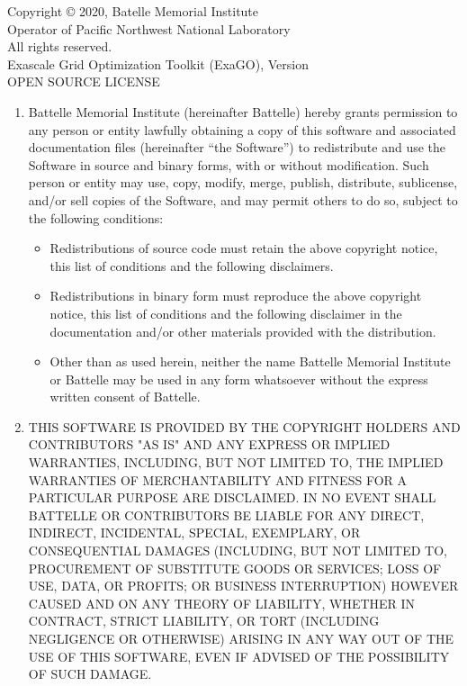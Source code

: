\noindent
Copyright © 2020, Batelle Memorial Institute \\
Operator of Pacific Northwest National Laboratory \\
All rights reserved. \\
Exascale Grid Optimization Toolkit (ExaGO), Version \exagoversion \\
OPEN SOURCE LICENSE \\

\noindent
\begin{enumerate}
\item Battelle Memorial Institute (hereinafter Battelle) hereby grants permission to any person or entity lawfully obtaining a copy of this software and associated documentation files (hereinafter “the Software”) to redistribute and use the Software in source and binary forms, with or without modification.  Such person or entity may use, copy, modify, merge, publish, distribute, sublicense, and/or sell copies of the Software, and may permit others to do so, subject to the following conditions:
\begin{itemize}
    \item Redistributions of source code must retain the above copyright notice, this list of conditions and the following disclaimers. 
   \item Redistributions in binary form must reproduce the above copyright notice, this list of conditions and the following disclaimer in the documentation and/or other materials provided with the distribution. 
   \item Other than as used herein, neither the name Battelle Memorial Institute or Battelle may be used in any form whatsoever without the express written consent of Battelle.
\end{itemize}  
\item THIS SOFTWARE IS PROVIDED BY THE COPYRIGHT HOLDERS AND CONTRIBUTORS "AS IS" AND ANY EXPRESS OR IMPLIED WARRANTIES, INCLUDING, BUT NOT LIMITED TO, THE IMPLIED WARRANTIES OF MERCHANTABILITY AND FITNESS FOR A PARTICULAR PURPOSE ARE DISCLAIMED. IN NO EVENT SHALL BATTELLE OR CONTRIBUTORS BE LIABLE FOR ANY DIRECT, INDIRECT, INCIDENTAL, SPECIAL, EXEMPLARY, OR CONSEQUENTIAL DAMAGES (INCLUDING, BUT NOT LIMITED TO, PROCUREMENT OF SUBSTITUTE GOODS OR SERVICES; LOSS OF USE, DATA, OR PROFITS; OR BUSINESS INTERRUPTION) HOWEVER CAUSED AND ON ANY THEORY OF LIABILITY, WHETHER IN CONTRACT, STRICT LIABILITY, OR TORT (INCLUDING NEGLIGENCE OR OTHERWISE) ARISING IN ANY WAY OUT OF THE USE OF THIS SOFTWARE, EVEN IF ADVISED OF THE POSSIBILITY OF SUCH DAMAGE.
\end{enumerate}

